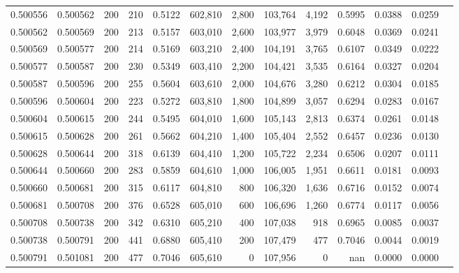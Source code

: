 \begin{tabular}{rrrrrrrrrrrrr}
0.500556 & 0.500562 &    200 & 210 &                                     0.5122 & 602,810 &   2,800 & 103,764 &   4,192 & 0.5995 & 0.0388 & 0.0259 \\
0.500562 & 0.500569 &    200 & 213 &                                     0.5157 & 603,010 &   2,600 & 103,977 &   3,979 & 0.6048 & 0.0369 & 0.0241 \\
0.500569 & 0.500577 &    200 & 214 &                                     0.5169 & 603,210 &   2,400 & 104,191 &   3,765 & 0.6107 & 0.0349 & 0.0222 \\
0.500577 & 0.500587 &    200 & 230 &                                     0.5349 & 603,410 &   2,200 & 104,421 &   3,535 & 0.6164 & 0.0327 & 0.0204 \\
0.500587 & 0.500596 &    200 & 255 &                                     0.5604 & 603,610 &   2,000 & 104,676 &   3,280 & 0.6212 & 0.0304 & 0.0185 \\
0.500596 & 0.500604 &    200 & 223 &                                     0.5272 & 603,810 &   1,800 & 104,899 &   3,057 & 0.6294 & 0.0283 & 0.0167 \\
0.500604 & 0.500615 &    200 & 244 &                                     0.5495 & 604,010 &   1,600 & 105,143 &   2,813 & 0.6374 & 0.0261 & 0.0148 \\
0.500615 & 0.500628 &    200 & 261 &                                     0.5662 & 604,210 &   1,400 & 105,404 &   2,552 & 0.6457 & 0.0236 & 0.0130 \\
0.500628 & 0.500644 &    200 & 318 &                                     0.6139 & 604,410 &   1,200 & 105,722 &   2,234 & 0.6506 & 0.0207 & 0.0111 \\
0.500644 & 0.500660 &    200 & 283 &                                     0.5859 & 604,610 &   1,000 & 106,005 &   1,951 & 0.6611 & 0.0181 & 0.0093 \\
0.500660 & 0.500681 &    200 & 315 &                                     0.6117 & 604,810 &     800 & 106,320 &   1,636 & 0.6716 & 0.0152 & 0.0074 \\
0.500681 & 0.500708 &    200 & 376 &                                     0.6528 & 605,010 &     600 & 106,696 &   1,260 & 0.6774 & 0.0117 & 0.0056 \\
0.500708 & 0.500738 &    200 & 342 &                                     0.6310 & 605,210 &     400 & 107,038 &     918 & 0.6965 & 0.0085 & 0.0037 \\
0.500738 & 0.500791 &    200 & 441 &                                     0.6880 & 605,410 &     200 & 107,479 &     477 & 0.7046 & 0.0044 & 0.0019 \\
0.500791 & 0.501081 &    200 & 477 &                                     0.7046 & 605,610 &       0 & 107,956 &       0 &    nan & 0.0000 & 0.0000 \\
\bottomrule
\end{tabular}
